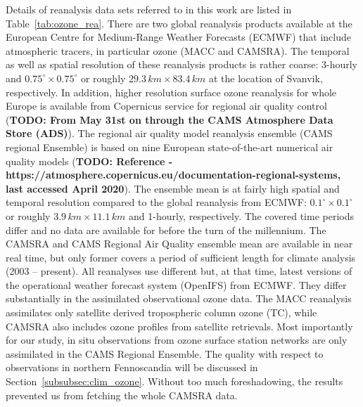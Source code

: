 \documentclass[bg, manuscript]{copernicus}
\begin{document}
Details of reanalysis data sets referred to in this work are listed in Table~\ref{tab:ozone_rea}.
There are two global reanalysis products available at the European Centre for Medium-Range Weather Forecasts (ECMWF) that include atmospheric tracers, in particular ozone (MACC and CAMSRA). The temporal as well as spatial resolution of these reanalysis products is rather coarse: 3-hourly and $0.75^\circ\times 0.75^\circ$ or roughly $29.3\,\unit{km}\times 83.4\,\unit{km}$ at the location of Svanvik, respectively. In addition, higher resolution surface ozone reanalysis for whole Europe is available from Copernicus service for regional air quality control ({\bf TODO: From May 31st on through the CAMS Atmosphere Data Store (ADS)}). The regional air quality model reanalysis ensemble (CAMS regional Ensemble) is based on nine European state-of-the-art numerical air quality models ({\bf TODO: Reference -  https://atmosphere.copernicus.eu/documentation-regional-systems, last accessed April 2020}). The ensemble mean is at fairly high spatial and temporal resolution compared to the global reanalysis from ECMWF: $0.1^\circ\times 0.1^\circ$ or roughly $3.9\,\unit{km}\times 11.1\,\unit{km}$ and 1-hourly, respectively. The covered time periods differ and no data are available for before the turn of the millennium. The CAMSRA and CAMS Regional Air Quality ensemble mean are available in near real time, but only former covers a period of sufficient length for climate analysis (2003 -- present). All reanalyses use different but, at that time, latest versions of the operational weather forecast system (OpenIFS) from ECMWF. They differ substantially in the assimilated observational ozone data. The MACC reanalysis assimilates only satellite derived tropospheric column ozone (TC), while CAMSRA also includes ozone profiles from satellite retrievals. Most importantly for our study, in situ observations from ozone surface station networks are only assimilated in the CAMS Regional Ensemble. The quality with respect to observations in northern Fennoscandia will be discussed in Section~\ref{subsubsec:clim_ozone}. Without too much foreshadowing, the results prevented us from fetching the whole CAMSRA data.
\end{document}
